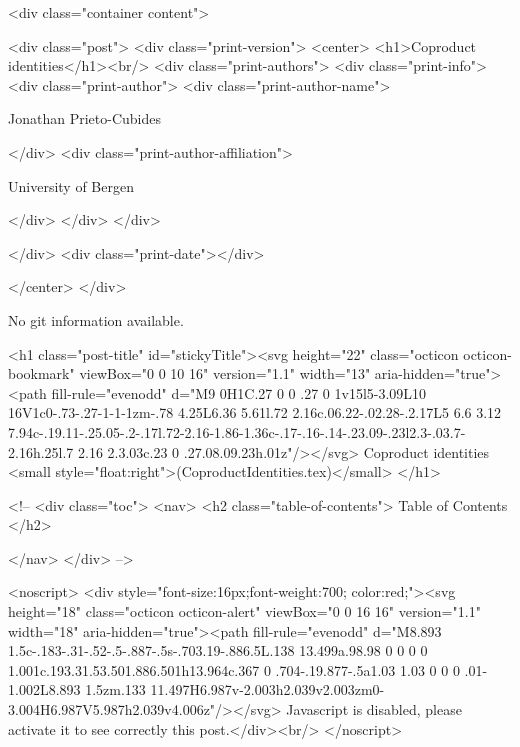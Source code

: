       <div class="container content">
        







<div class="post">
  <div class="print-version">
    <center>
      <h1>Coproduct identities</h1><br/>
        <div class="print-authors">
          <div class="print-info">
            <div class="print-author">
              <div class="print-author-name">
                
                  Jonathan Prieto-Cubides
                
              </div>
              <div class="print-author-affiliation">
                
                  University of Bergen
                
                </div>
            </div>
          </div>
          
          
        </div>
        <div class="print-date"></div>
        
        
    </center>
  </div>

  
  No git information available.
  

  <h1 class="post-title" id="stickyTitle"><svg height="22" class="octicon octicon-bookmark" viewBox="0 0 10 16" version="1.1" width="13" aria-hidden="true"><path fill-rule="evenodd" d="M9 0H1C.27 0 0 .27 0 1v15l5-3.09L10 16V1c0-.73-.27-1-1-1zm-.78 4.25L6.36 5.61l.72 2.16c.06.22-.02.28-.2.17L5 6.6 3.12 7.94c-.19.11-.25.05-.2-.17l.72-2.16-1.86-1.36c-.17-.16-.14-.23.09-.23l2.3-.03.7-2.16h.25l.7 2.16 2.3.03c.23 0 .27.08.09.23h.01z"/></svg> Coproduct identities <small style="float:right">(CoproductIdentities.tex)</small>
  </h1>

  <!-- 
  <div class="toc">
    <nav>
    <h2 class="table-of-contents"> Table of Contents </h2>
      

    </nav>
  </div>
   -->

  <noscript>
  <div style="font-size:16px;font-weight:700; color:red;"><svg height="18" class="octicon octicon-alert" viewBox="0 0 16 16" version="1.1" width="18" aria-hidden="true"><path fill-rule="evenodd" d="M8.893 1.5c-.183-.31-.52-.5-.887-.5s-.703.19-.886.5L.138 13.499a.98.98 0 0 0 0 1.001c.193.31.53.501.886.501h13.964c.367 0 .704-.19.877-.5a1.03 1.03 0 0 0 .01-1.002L8.893 1.5zm.133 11.497H6.987v-2.003h2.039v2.003zm0-3.004H6.987V5.987h2.039v4.006z"/></svg> Javascript is disabled, please activate it to see correctly this post.</div><br/>
  </noscript>

